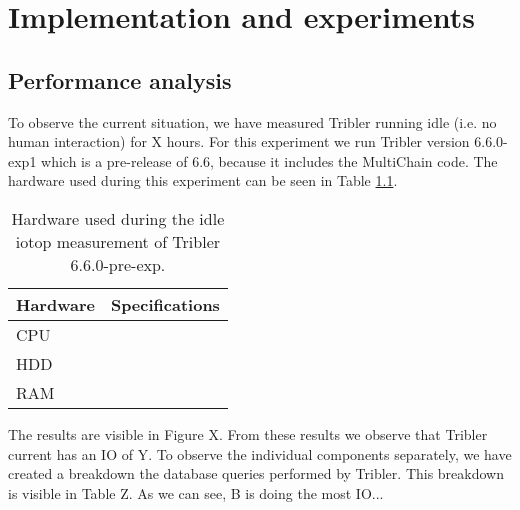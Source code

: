 \chapter{Implementation and experiments}
\label{implementation_and_experiments}

\section{Performance analysis}
To observe the current situation, we have measured Tribler running idle (i.e. no human interaction) for X hours. 
For this experiment we run Tribler version 6.6.0-exp1 which is a pre-release of 6.6, because it includes the MultiChain code.
The hardware used during this experiment can be seen in Table \ref{table:tribler_idle}.

\begin{table}[h]
	\centering
	\begin{tabular}{l|l}
		Hardware	& Specifications \\ \hline
		CPU			&  \\ 
		HDD			&  \\ 
		RAM			&  \\
	\end{tabular}
	\caption{Hardware used during the idle iotop measurement of Tribler 6.6.0-pre-exp.}
	\label{table:tribler_idle}
\end{table}

The results are visible in Figure X.
From these results we observe that Tribler current has an IO of Y.
To observe the individual components separately, we have created a breakdown the database queries performed by Tribler.
This breakdown is visible in Table Z.
As we can see, B is doing the most IO... 
